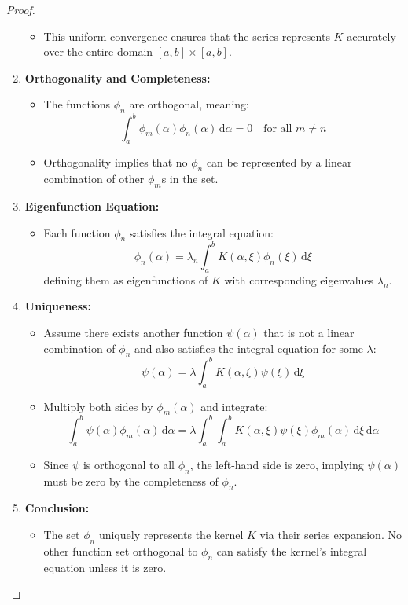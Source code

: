 \documentclass{article}
\begin{document}
\begin{proof}
\begin{enumerate}
\begin{itemize}
\item This uniform convergence ensures that the series represents $K$
accurately over the entire domain $[a, b] \times [a, b]$.
\end{itemize}
\item \textbf{Orthogonality and Completeness:}
\begin{itemize}
\item The functions $\phi_n$ are orthogonal, meaning:
\begin{equation}
\int_a^b \phi_m (\alpha) \phi_n (\alpha) \, \mathrm{d} \alpha = 0 \quad \text{for
all } m \neq n
\end{equation}
\item Orthogonality implies that no $\phi_n$ can be represented by a
linear combination of other $\phi_m$s in the set.
\end{itemize}
\item \textbf{Eigenfunction Equation:}
\begin{itemize}
\item Each function $\phi_n$ satisfies the integral equation:
\begin{equation}
\phi_n (\alpha) = \lambda_n \int_a^b K (\alpha, \xi) \phi_n (\xi) \, \mathrm{d}
\xi
\end{equation}
defining them as eigenfunctions of $K$ with corresponding eigenvalues
$\lambda_n$.
\end{itemize}
\item \textbf{Uniqueness:}
\begin{itemize}
\item Assume there exists another function $\psi (\alpha)$ that is not a
linear combination of $\phi_n$ and also satisfies the integral equation
for some $\lambda$:
\begin{equation}
\psi (\alpha) = \lambda \int_a^b K (\alpha, \xi) \psi (\xi) \, \mathrm{d} \xi
\end{equation}
\item Multiply both sides by $\phi_m (\alpha)$ and integrate:
\begin{equation}
\int_a^b \psi (\alpha) \phi_m (\alpha) \, \mathrm{d} \alpha = \lambda \int_a^b
\int_a^b K (\alpha, \xi) \psi (\xi) \phi_m (\alpha) \, \mathrm{d} \xi \, \mathrm{d} \alpha
\end{equation}
\item Since $\psi$ is orthogonal to all $\phi_n$, the left-hand side is
zero, implying $\psi (\alpha)$ must be zero by the completeness of
$\phi_n$.
\end{itemize}
\item \textbf{Conclusion:}
\begin{itemize}
\item The set $\phi_n$ uniquely represents the kernel $K$ via their
series expansion. No other function set orthogonal to $\phi_n$ can
satisfy the kernel's integral equation unless it is zero.


\end{itemize}
\end{enumerate}
\end{proof}
\end{document}
